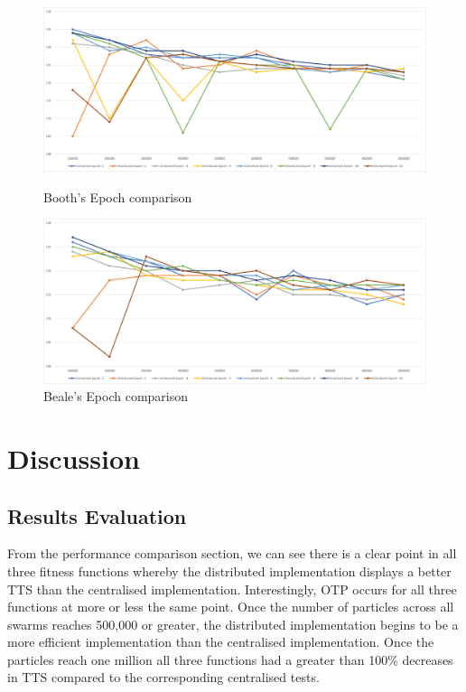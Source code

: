 \documentclass[oneside,12pt]{book}
\begin{document}
\begin{figure}[H]
  \centering
  \begin{minipage}[b]{0.48\textwidth}
    \includegraphics[width=\textwidth]{Images/Graphs/PerformanceComparisonBoothsEpoch.png}
    \caption{Booth's Epoch comparison}
    \label{fig:PerformanceComparisonBoothsEpoch}
  \end{minipage}
  \hfill
  \begin{minipage}[b]{0.48\textwidth}
    \includegraphics[width=\textwidth]{Images/Graphs/PerformanceComparisonBealeEpoch.png}
    \caption{Beale's Epoch comparison}
    \label{fig:PerformanceComparisonBealeEpoch}
  \end{minipage}
\end{figure}

\section{Discussion}
\subsection{Results Evaluation}
From the performance comparison section, we can see there is a clear point in all three fitness functions whereby the distributed implementation displays a better TTS than the centralised implementation. Interestingly, OTP occurs for all three functions at more or less the same point. Once the number of particles across all swarms reaches 500,000 or greater, the distributed implementation begins to be a more efficient implementation than the centralised implementation. Once the particles reach one million all three functions had a greater than 100\% decreases in TTS compared to the corresponding centralised tests.
\end{document}
